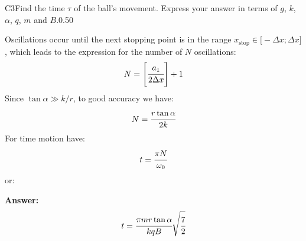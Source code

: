 \documentclass[11pt,a4paper]{article}
\begin{document}
\begin{solcard}{C3}{Find the time $\tau$ of the ball's movement. Express your answer in terms of $g$, $k$, $\alpha$, $q$, $m$ and $B$.}{0.50}

Oscillations occur until the next stopping point is in the range $x_\text{stop}\in\bigl[-\Delta{x}{;}\Delta{x}\bigr]$, which leads to the expression for the number of $N$ oscillations: $$N=\Biggl[\cfrac{a_1}{2\Delta{x}}\Biggr]+1 $$Since $\tan\alpha \gg k/r$, to good accuracy we have: $$N=\cfrac{r\tan\alpha}{2k} $$For time motion have: $$t=\cfrac{\pi N}{\omega_0} $$or:

\par\smallskip\noindent\textbf{Answer:} $$t=\cfrac{\pi mr\tan\alpha}{kqB}\sqrt{\cfrac{7}{2}} $$
\end{solcard}
\end{document}
